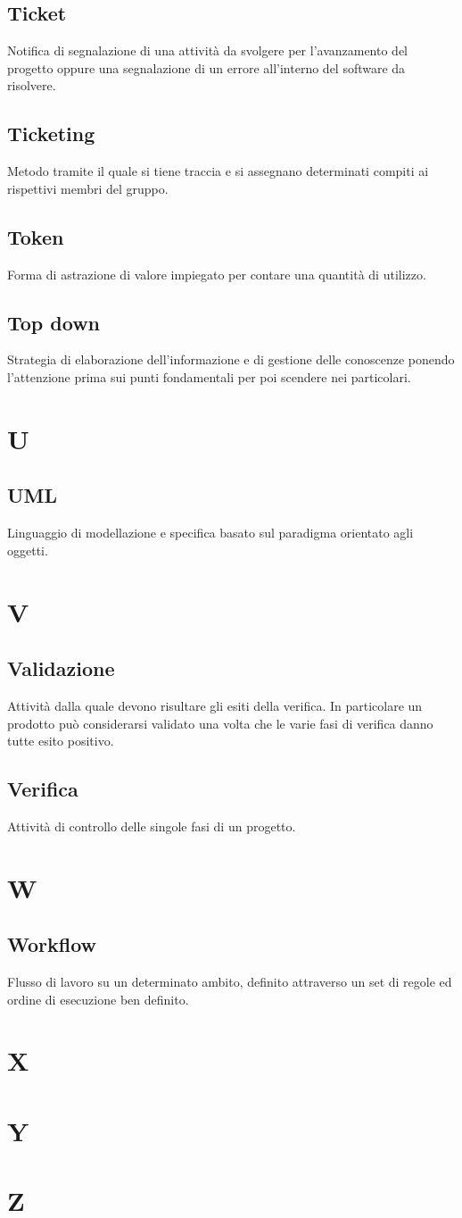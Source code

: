 \subsection*{Ticket} Notifica di segnalazione di una attività da svolgere per l'avanzamento del progetto oppure una segnalazione di un errore all'interno del software da risolvere.
\subsection*{Ticketing} Metodo tramite il quale si tiene traccia e si assegnano determinati compiti ai rispettivi membri del gruppo.
\subsection*{Token} Forma di astrazione di valore impiegato per contare una quantità di utilizzo.
\subsection*{Top down} Strategia di elaborazione dell'informazione e di gestione delle conoscenze ponendo l'attenzione prima sui punti fondamentali per poi scendere nei particolari.
\newpage
\section{U}
\subsection*{UML} Linguaggio di modellazione e specifica basato sul paradigma orientato agli oggetti.
\newpage
\section{V}
\subsection*{Validazione} Attività dalla quale devono risultare gli esiti della verifica. In particolare un prodotto può considerarsi validato una volta che le varie fasi di verifica danno tutte esito positivo.
\subsection*{Verifica} Attività di controllo delle singole fasi di un progetto.
\newpage
\section{W}
\subsection*{Workflow} Flusso di lavoro su un determinato ambito, definito attraverso un set di regole ed ordine di esecuzione ben definito.
\newpage
\section{X}
\newpage
\section{Y}
\newpage
\section{Z}